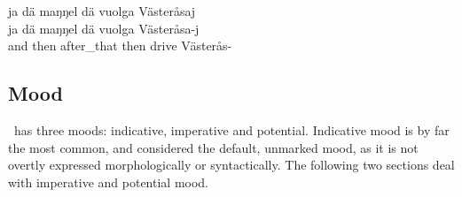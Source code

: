 \z
\ea\label{presentEx3}%
\glll	ja dä maŋŋel dä vuolga Västeråsaj\\
	ja dä maŋŋel dä vuolga Västeråsa-j\\
	and then after\_that then drive\BS{} Västerås-\\\nopagebreak
{}	
\z

\subsection{Mood}\label{mood}
\PS\ has three moods: indicative, imperative and potential. Indicative mood is by far the most common, and considered the default, unmarked mood, as it is not overtly expressed morphologically or syntactically. %
The following two sections deal with imperative and potential mood. %

